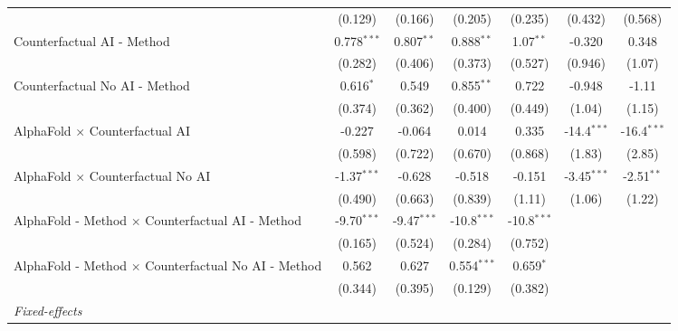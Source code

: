 \begin{tabular}{lcccccc}
                                                              & (0.129)       & (0.166)       & (0.205)       & (0.235)       & (0.432)       & (0.568)\\   
   Counterfactual AI - Method                                 & 0.778$^{***}$ & 0.807$^{**}$  & 0.888$^{**}$  & 1.07$^{**}$   & -0.320        & 0.348\\   
                                                              & (0.282)       & (0.406)       & (0.373)       & (0.527)       & (0.946)       & (1.07)\\   
   Counterfactual No AI - Method                              & 0.616$^{*}$   & 0.549         & 0.855$^{**}$  & 0.722         & -0.948        & -1.11\\   
                                                              & (0.374)       & (0.362)       & (0.400)       & (0.449)       & (1.04)        & (1.15)\\   
   AlphaFold $\times$ Counterfactual AI                       & -0.227        & -0.064        & 0.014         & 0.335         & -14.4$^{***}$ & -16.4$^{***}$\\   
                                                              & (0.598)       & (0.722)       & (0.670)       & (0.868)       & (1.83)        & (2.85)\\   
   AlphaFold $\times$ Counterfactual No AI                    & -1.37$^{***}$ & -0.628        & -0.518        & -0.151        & -3.45$^{***}$ & -2.51$^{**}$\\   
                                                              & (0.490)       & (0.663)       & (0.839)       & (1.11)        & (1.06)        & (1.22)\\   
   AlphaFold - Method $\times$ Counterfactual AI - Method     & -9.70$^{***}$ & -9.47$^{***}$ & -10.8$^{***}$ & -10.8$^{***}$ &               &   \\   
                                                              & (0.165)       & (0.524)       & (0.284)       & (0.752)       &               &   \\   
   AlphaFold - Method $\times$ Counterfactual No AI - Method  & 0.562         & 0.627         & 0.554$^{***}$ & 0.659$^{*}$   &               &   \\   
                                                              & (0.344)       & (0.395)       & (0.129)       & (0.382)       &               &   \\   
   \midrule
   \emph{Fixed-effects}\\

\end{tabular}

